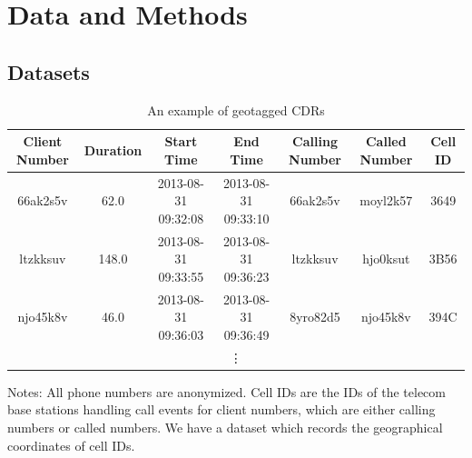
\chapter{Data and Methods}
\section{Datasets}
\begin{table}[htbp]
\vspace{0.3cm}
\renewcommand{\arraystretch}{1.6}
\setlength{\tabcolsep}{1.9mm}{}
\centering
\scriptsize
\caption{An example of geotagged CDRs}

\begin{tabular}{ccccccc}
\hline

\textbf{Client Number} & \textbf{Duration} & \textbf{Start Time} & \textbf{End Time} & \textbf{Calling Number} & \textbf{Called Number} & \textbf{Cell ID} \\ \hline

66ak2s5v & 62.0 & 2013-08-31 09:32:08 & 2013-08-31 09:33:10 & 66ak2s5v & moyl2k57 & 3649 \\

ltzkksuv & 148.0 & 2013-08-31 09:33:55 & 2013-08-31 09:36:23 & ltzkksuv & hjo0ksut & 3B56 \\

njo45k8v & 46.0 & 2013-08-31 09:36:03 & 2013-08-31 09:36:49 & 8yro82d5 & njo45k8v & 394C \\

\multicolumn{7}{c}{\vdots} \\
\hline
\end{tabular}%

\label{tab:example_cdr}
\end{table}

\vspace{-3em}
\begin{singlespace}
\begin{footnotesize}
\noindent Notes: All phone numbers are anonymized. Cell IDs are the IDs of the telecom base stations handling call events for client numbers, which are either calling numbers or called numbers. We have a dataset which records the geographical coordinates of cell IDs.
\end{footnotesize}
\end{singlespace}


